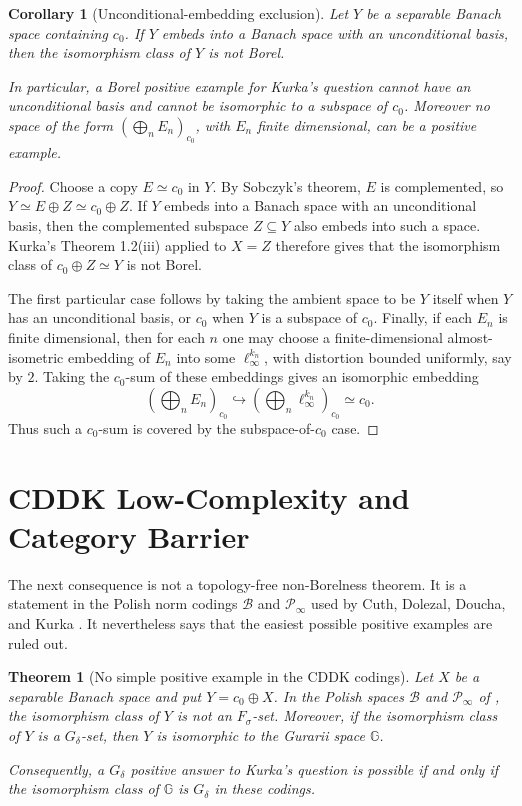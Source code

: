 \documentclass[11pt]{article}
\newtheorem*{theorem}{Theorem}
\newtheorem*{corollary}{Corollary}
\begin{document}
\begin{corollary}[Unconditional-embedding exclusion]
Let \(Y\) be a separable Banach space containing \(c_0\).  If \(Y\) embeds into
a Banach space with an unconditional basis, then the isomorphism class of \(Y\)
is not Borel.

In particular, a Borel positive example for Kurka's question cannot have an
unconditional basis and cannot be isomorphic to a subspace of \(c_0\).  Moreover
no space of the form \((\bigoplus_n E_n)_{c_0}\), with \(E_n\) finite
dimensional, can be a positive example.
\end{corollary}

\begin{proof}
Choose a copy \(E\simeq c_0\) in \(Y\).  By Sobczyk's theorem, \(E\) is
complemented, so \(Y\simeq E\oplus Z\simeq c_0\oplus Z\).  If \(Y\) embeds into
a Banach space with an unconditional basis, then the complemented subspace
\(Z\subseteq Y\) also embeds into such a space.  Kurka's Theorem 1.2(iii)
applied to \(X=Z\) therefore gives that the isomorphism class of
\(c_0\oplus Z\simeq Y\) is not Borel.

The first particular case follows by taking the ambient space to be \(Y\)
itself when \(Y\) has an unconditional basis, or \(c_0\) when \(Y\) is a subspace
of \(c_0\).  Finally, if each \(E_n\) is finite dimensional, then for each \(n\)
one may choose a finite-dimensional almost-isometric embedding of \(E_n\) into
some \(\ell_\infty^{k_n}\), with distortion bounded uniformly, say by \(2\).
Taking the \(c_0\)-sum of these embeddings gives an isomorphic embedding
\[
  \left(\bigoplus_n E_n\right)_{c_0}
  \hookrightarrow
  \left(\bigoplus_n \ell_\infty^{k_n}\right)_{c_0}
  \simeq c_0.
\]
Thus such a \(c_0\)-sum is covered by the subspace-of-\(c_0\) case.
\end{proof}

\section*{CDDK Low-Complexity and Category Barrier}

The next consequence is not a topology-free non-Borelness theorem.  It is a
statement in the Polish norm codings \(\mathcal B\) and \(\mathcal P_\infty\)
used by Cuth, Dolezal, Doucha, and Kurka \cite{CDDK}.  It nevertheless says
that the easiest possible positive examples are ruled out.

\begin{theorem}[No simple positive example in the CDDK codings]
Let \(X\) be a separable Banach space and put \(Y=c_0\oplus X\).  In the
Polish spaces \(\mathcal B\) and \(\mathcal P_\infty\) of \cite{CDDK}, the
isomorphism class of \(Y\) is not an \(F_\sigma\)-set.  Moreover, if the
isomorphism class of \(Y\) is a \(G_\delta\)-set, then \(Y\) is isomorphic to
the Gurarii space \(\mathbb G\).

Consequently, a \(G_\delta\) positive answer to Kurka's question is possible
if and only if the isomorphism class of \(\mathbb G\) is \(G_\delta\) in these
codings.
\end{theorem}
\end{document}
